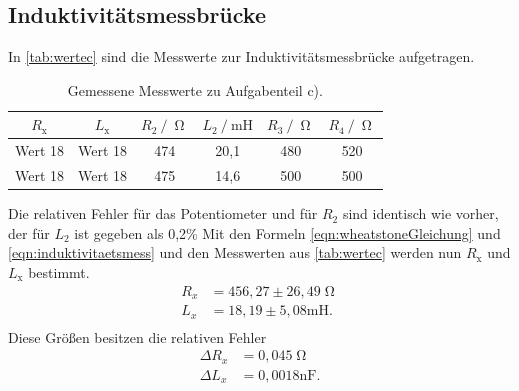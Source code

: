 \subsection{Induktivitätsmessbrücke}
In \autoref{tab:wertec} sind die Messwerte zur Induktivitätsmessbrücke aufgetragen.
\begin{table}[H]
  \centering
  \caption{Gemessene Messwerte zu Aufgabenteil c).}
  \label{tab:wertec}
  \begin{tabular}{c c c c c c}
    \toprule
    $R_{\text{x}}$ & $L_{\text{x}}$ & $R_{\text{2}} \:/\: \upOmega$ & $L_{\text{2}} \:/\: \si{\milli\henry}$ & $R_{\text{3}} \:/\: \upOmega$ & $R_{\text{4}} \:/\: \upOmega$ \\
    \midrule
    Wert 18 & Wert 18 & 474 & 20,1 & 480 & 520 \\
    Wert 18 & Wert 18 & 475 & 14,6 & 500 & 500 \\
    \bottomrule
  \end{tabular}
\end{table}
Die relativen Fehler für das Potentiometer und für $R_2$ sind identisch wie vorher, der für $L_2$ ist gegeben als 0,2\%
Mit den Formeln \autoref{eqn:wheatstoneGleichung} und \autoref{eqn:induktivitaetsmess} und den Messwerten aus \autoref{tab:wertec} werden nun $R_{\text{x}}$
und $L_{\text{x}}$ bestimmt.
\begin{align*}
  R_x &= 456,27 \pm 26,49 \upOmega \\
  L_x &= 18,19 \pm 5,08 \si{\milli\henry} . \\
\end{align*}
Diese Größen besitzen die relativen Fehler
\begin{align*}
  \Delta R_x &= 0,045 \upOmega \\
  \Delta L_x &= 0,0018 \si{\nano\farad} . \\
\end{align*}


